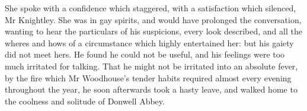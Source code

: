 She spoke with a confidence which staggered, with a satisfaction which silenced, Mr Knightley. She was in gay spirits, and would have prolonged the conversation, wanting to hear the particulars of his suspicions, every look described, and all the wheres and hows of a circumstance which highly entertained her: but his gaiety did not meet hers. He found he could not be useful, and his feelings were too much irritated for talking. That he might not be irritated into an absolute fever, by the fire which Mr Woodhouse's tender habits required almost every evening throughout the year, he soon afterwards took a hasty leave, and walked home to the coolness and solitude of Donwell Abbey.